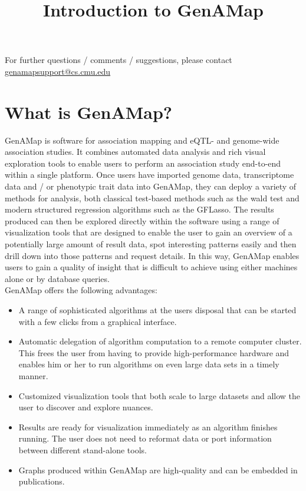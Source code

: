 \documentclass{article}
\title{Introduction to GenAMap}
\author{}
\date{}
\begin{document}
\maketitle

\tableofcontents
\vspace{1cm}
For further questions / comments / suggestions, please contact \url{genamapsupport@cs.cmu.edu}

\section{What is GenAMap?}

GenAMap is software for association mapping and eQTL- and genome-wide association studies. It combines automated data analysis and rich visual exploration tools to enable users to perform an association study end-to-end within a single platform. Once users have imported genome data, transcriptome data and / or phenotypic trait data into GenAMap, they can deploy a variety of methods for analysis, both classical test-based methods such as the wald test and modern structured regression algorithms such as the GFLasso. The results produced can then be explored directly within the software using a range of visualization tools that are designed to enable the user to gain an overview of a potentially large amount of result data, spot interesting patterns easily and then drill down into those patterns and request details. In this way, GenAMap enables users to gain a quality of insight that is difficult to achieve using either machines alone or by database queries.\\

GenAMap offers the following advantages: 

\begin{itemize}
\item A range of sophisticated algorithms at the users disposal that can be started with a few clicks from a graphical interface. 
\item Automatic delegation of algorithm computation to a remote computer cluster. This frees the user from having to provide high-performance hardware and enables him or her to run algorithms on even large data sets in a timely manner.
\item Customized visualization tools that both scale to large datasets and allow the user to discover and explore nuances. 
\item Results are ready for visualization immediately as an algorithm finishes running. The user does not need to reformat data or port information between different stand-alone tools.
\item Graphs produced within GenAMap are high-quality and can be embedded in publications.
\end{itemize}
\end{document}
